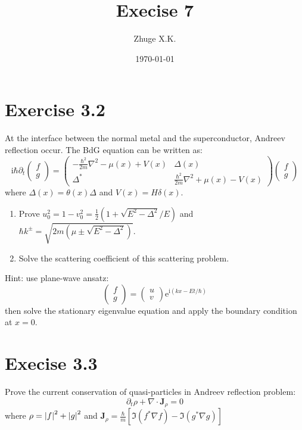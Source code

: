 \documentclass[11pt,a4paper]{article}
\title{Execise 7}
\author{Zhuge X.K.}
\date{\today}
\theoremstyle{plain}
\theoremstyle{definition}
\theoremstyle{remark}
\newcommand{\ii}{\mathrm{i}}                      %
\newcommand{\eexp}{\mathrm{e}}                    %
\renewcommand{\vec}[1]{\boldsymbol{#1}}
\begin{document}
\maketitle
\section*{Exercise 3.2}
At the interface between the normal metal and the superconductor, Andreev reflection occur. The BdG equation can be written as:
\begin{equation*}
    \ii \hbar \partial_t 
    \begin{pmatrix}
        f\\
        g
    \end{pmatrix}
    =
    \begin{pmatrix}
        -\frac{\hbar^2}{2m}\nabla^2 - \mu(x) + V(x) & \Delta(x)\\
        \Delta^* & \frac{\hbar^2}{2m}\nabla^2 + \mu(x) - V(x)
    \end{pmatrix}
    \begin{pmatrix}
        f\\
        g 
    \end{pmatrix}
\end{equation*}
where $\Delta(x) = \theta(x)\Delta$ and $V(x) = H\delta(x)$.
\begin{enumerate}
    \item Prove $u_0^2 = 1 - v_0^2 = \frac{1}{2}(1 + \sqrt{E^2-\Delta^2}/E)$ and $\hbar k^{\pm} = \sqrt{2m(\mu \pm \sqrt{E^2 - \Delta^2})}$.
    \item Solve the scattering coefficient of this scattering problem.
\end{enumerate}
Hint: use plane-wave ansatz:
\begin{equation*}
    \begin{pmatrix}
        f\\
        g   
    \end{pmatrix}
    =
    \begin{pmatrix}
        u\\
        v
    \end{pmatrix}
    \eexp^{\ii (kx-Et/\hbar)}
\end{equation*}
then solve the stationary eigenvalue equation and apply the boundary condition at $x=0$.
\section*{Execise 3.3}
Prove the current conservation of quasi-particles in Andreev reflection problem:
\begin{equation*}
    \partial_t \rho + \nabla \cdot \vec{J}_\rho = 0
\end{equation*}
where $\rho=\abs{f}^2 + \abs{g}^2$ and $\vec{J}_\rho = \frac{\hbar}{m} \left[ \Im(f^*\nabla f) - \Im (g^*\nabla g) \right]$
\end{document}
